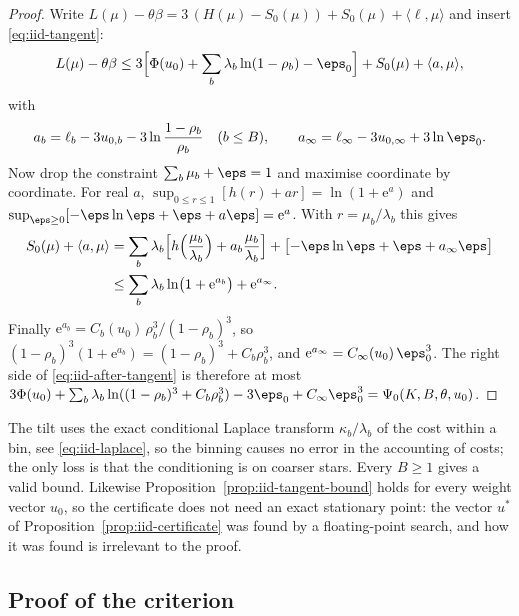 \begin{proof}
Write $L(\mu)-\theta\beta=3\,(H(\mu)-S_0(\mu))+S_0(\mu)+\langle\ell,\mu\rangle$ and insert
\eqref{eq:iid-tangent}:
\begin{equation}\label{eq:iid-after-tangent}
L(\mu)-\theta\beta\le3\Bigl[\Phi(u_0)+\sum_b\lambda_b\ln(1-\rho_b)-\eps_0\Bigr]
+S_0(\mu)+\langle a,\mu\rangle,
\end{equation}
with
\[
a_b=\ell_b-3u_{0,b}-3\ln\frac{1-\rho_b}{\rho_b}\quad(b\le B),\qquad
a_\infty=\ell_\infty-3u_{0,\infty}+3\ln\eps_0 .
\]
Now drop the constraint $\sum_b\mu_b+\eps=1$ and maximise coordinate by coordinate. For
real $a$, $\sup_{0\le r\le1}[h(r)+ar]=\ln(1+\mathrm{e}^a)$ and
$\sup_{\eps\ge0}[-\eps\ln\eps+\eps+a\eps]=\mathrm{e}^a$. With $r=\mu_b/\lambda_b$ this
gives
\begin{align*}
S_0(\mu)+\langle a,\mu\rangle
&=\sum_b\lambda_b\Bigl[h\Bigl(\frac{\mu_b}{\lambda_b}\Bigr)+a_b\frac{\mu_b}{\lambda_b}\Bigr]
+\bigl[-\eps\ln\eps+\eps+a_\infty\eps\bigr]\\
&\le\sum_b\lambda_b\ln\bigl(1+\mathrm{e}^{a_b}\bigr)+\mathrm{e}^{a_\infty}.
\end{align*}
Finally $\mathrm{e}^{a_b}=C_b(u_0)\,\rho_b^3/(1-\rho_b)^3$, so
$(1-\rho_b)^3(1+\mathrm{e}^{a_b})=(1-\rho_b)^3+C_b\rho_b^3$, and
$\mathrm{e}^{a_\infty}=C_\infty(u_0)\,\eps_0^3$. The right side of
\eqref{eq:iid-after-tangent} is therefore at most
$3\Phi(u_0)+\sum_b\lambda_b\ln((1-\rho_b)^3+C_b\rho_b^3)-3\eps_0+C_\infty\eps_0^3
=\Psi_0(K,B,\theta,u_0)$.
\end{proof}

\begin{remark}\label{rem:iid-binning}
The tilt uses the exact conditional Laplace transform $\kappa_b/\lambda_b$ of the cost
within a bin, see \eqref{eq:iid-laplace}, so the binning causes no error in the
accounting of costs; the only loss is that the conditioning is on coarser stars. Every
$B\ge1$ gives a valid bound. Likewise Proposition~\ref{prop:iid-tangent-bound} holds for
every weight vector $u_0$, so the certificate does not need an exact stationary point: the
vector $u^\ast$ of Proposition~\ref{prop:iid-certificate} was found by a floating-point
search, and how it was found is irrelevant to the proof.
\end{remark}

\subsection{Proof of the criterion}\label{subsec:iid-proof}

